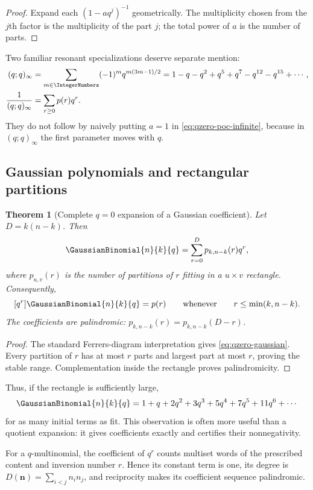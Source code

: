 \documentclass[11pt,oneside]{article}
\newtheorem{theorem}{Theorem}[section]
\theoremstyle{definition}
\theoremstyle{remark}
\let\reportsubsection\subsection
\let\section\reportsubsection
\begin{document}
\begin{proof}
Expand each $(1-aq^j)^{-1}$ geometrically.  The multiplicity chosen from the
$j$th factor is the multiplicity of the part $j$; the total power of $a$ is the
number of parts.
\end{proof}

Two familiar resonant specializations deserve separate mention:
\begin{align}
 (q;q)_\infty
 &=\sum_{m\in\IntegerNumbers}(-1)^m q^{m(3m-1)/2}
 =1-q-q^2+q^5+q^7-q^{12}-q^{15}+\cdots,\label{eq:pentagonal}\\
 \frac1{(q;q)_\infty}&=\sum_{r\ge0}p(r)q^r.\label{eq:partition-generating}
\end{align}
They do not follow by naively putting $a=1$ in
\eqref{eq:qzero-poc-infinite}, because in $(q;q)_\infty$ the first parameter
moves with $q$.

\section{Gaussian polynomials and rectangular partitions}

\begin{theorem}[Complete $q=0$ expansion of a Gaussian coefficient]
\label{thm:qzero-gaussian}
Let $D=k(n-k)$.  Then
\begin{equation}\label{eq:qzero-gaussian}
 \GaussianBinomial{n}{k}{q}=\sum_{r=0}^{D}p_{k,n-k}(r)q^r,
\end{equation}
where $p_{u,v}(r)$ is the number of partitions of $r$ fitting in a
$u\times v$ rectangle.  Consequently,
\[
 [q^r]\GaussianBinomial{n}{k}{q}=p(r)
 \qquad\text{whenever}\qquad r\le\min(k,n-k).
\]
The coefficients are palindromic:
$p_{k,n-k}(r)=p_{k,n-k}(D-r)$.
\end{theorem}

\begin{proof}
The standard Ferrers-diagram interpretation gives
\eqref{eq:qzero-gaussian}.  Every partition of $r$ has at most $r$ parts and
largest part at most $r$, proving the stable range.  Complementation inside the
rectangle proves palindromicity.
\end{proof}

Thus, if the rectangle is sufficiently large,
\[
 \GaussianBinomial{n}{k}{q}=1+q+2q^2+3q^3+5q^4+7q^5+11q^6+\cdots
\]
for as many initial terms as fit.  This observation is often more useful than
a quotient expansion: it gives coefficients exactly and certifies their
nonnegativity.

For a $q$-multinomial, the coefficient of $q^r$ counts multiset words of the
prescribed content and inversion number $r$.  Hence its constant term is one,
its degree is $D(\bm n)=\sum_{i<j}n_i n_j$, and reciprocity makes its
coefficient sequence palindromic.
\end{document}
